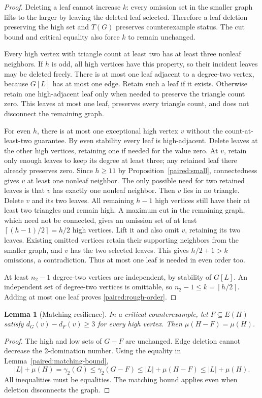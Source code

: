 \documentclass[11pt,a4paper]{article}
\newtheorem{lemma}[theorem]{Lemma}
\theoremstyle{definition}\newtheorem{definition}[theorem]{Definition}
\theoremstyle{remark}\newtheorem{remark}[theorem]{Remark}
\newcommand{\ceil}[1]{\left\lceil#1\right\rceil}
\begin{document}
\begin{proof}
Deleting a leaf cannot increase $k$: every omission set in the smaller
graph lifts to the larger by leaving the deleted leaf selected.
Therefore a leaf deletion preserving the high set and $T(G)$
preserves counterexample status. The cut bound and critical equality
also force $k$ to remain unchanged.

Every high vertex with triangle count at least two has at least
three nonleaf neighbors. If $h$ is odd, all high vertices have this
property, so their incident leaves may be deleted freely. There is
at most one leaf adjacent to a degree-two vertex, because $G[L]$
has at most one edge. Retain such a leaf if it exists. Otherwise
retain one high-adjacent leaf only when needed to preserve the
triangle count zero. This leaves at most one leaf, preserves every
triangle count, and does not disconnect the remaining graph.

For even $h$, there is at most one exceptional high vertex $v$
without the count-at-least-two guarantee. By even stability every
leaf is high-adjacent. Delete leaves at the other high vertices,
retaining one if needed for the value zero. At $v$, retain only
enough leaves to keep its degree at least three; any retained leaf
there already preserves zero. Since $h\ge11$ by
Proposition~\ref{paired:small}, connectedness gives $v$ at least one
nonleaf neighbor. The only possible need for two retained leaves
is that $v$ has exactly one nonleaf neighbor. Then $v$ lies in no
triangle. Delete $v$ and its two leaves. All remaining $h-1$ high
vertices still have their at least two triangles and remain high.
A maximum cut in the remaining graph, which need not be connected,
gives an omission set of at least $\ceil{(h-1)/2}=h/2$ high vertices.
Lift it and also omit $v$, retaining its two leaves. Existing omitted
vertices retain their supporting neighbors from the smaller graph,
and $v$ has the two selected leaves. This gives $h/2+1>k$ omissions,
a contradiction. Thus at most one leaf is needed in even order too.

At least $n_2-1$ degree-two vertices are independent, by stability
of $G[L]$. An independent set of degree-two vertices is omittable,
so $n_2-1\le k=\ceil{h/2}$. Adding at most one leaf proves
\eqref{paired:rough-order}.
\end{proof}

\begin{lemma}[Matching resilience]\label{paired:resilience}
In a critical counterexample, let $F\subseteq E(H)$ satisfy
$d_G(v)-d_F(v)\ge3$ for every high vertex. Then
$\mu(H-F)=\mu(H)$.
\end{lemma}
\begin{proof}
The high and low sets of $G-F$ are unchanged. Edge deletion cannot
decrease the 2-domination number. Using the equality in
Lemma~\ref{paired:matching-bound},
\[
 |L|+\mu(H)=\gamma_2(G)\le\gamma_2(G-F)
 \le |L|+\mu(H-F)\le |L|+\mu(H).
\]
All inequalities must be equalities. The matching bound applies even
when deletion disconnects the graph.
\end{proof}
\end{document}
